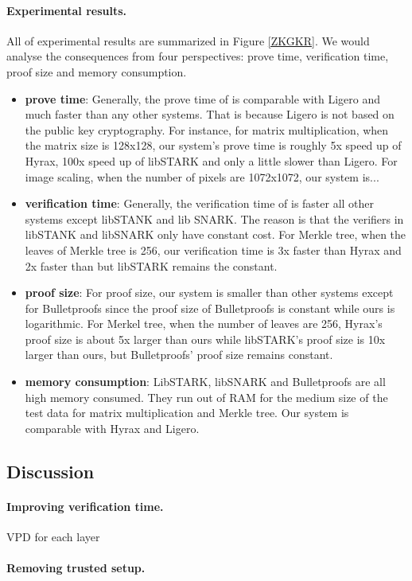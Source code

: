\paragraph{Experimental results.} All of experimental results are summarized in Figure \ref{ZKGKR}. We would analyse the consequences from four perspectives: prove time, verification time, proof size and memory consumption.
\begin{itemize}
	\item \textbf{prove time}: Generally, the prove time of \name{} is comparable with Ligero and much faster than any other systems. That is because Ligero is not based on the public key cryptography. For instance, for matrix multiplication, when the matrix size is 128x128, our system's prove time is roughly 5x speed up of Hyrax, 100x speed up of libSTARK and only a little slower than Ligero. For image scaling, when the number of pixels are 1072x1072, our system is...
	\item \textbf{verification time}: Generally, the verification time of \name{} is faster all other systems except libSTANK and lib SNARK. The reason is that the verifiers in libSTANK and libSNARK only have constant cost. For Merkle tree, when the leaves of Merkle tree is 256, our verification time is 3x faster than Hyrax and 2x faster than but libSTARK remains the constant. 
	\item \textbf{proof size}: For proof size, our system is smaller than other systems except for Bulletproofs since the proof size of Bulletproofs is constant while ours is logarithmic. For Merkel tree, when the number of leaves are 256, Hyrax's proof size is about 5x larger than ours while libSTARK's proof size is 10x larger than ours, but Bulletproofs' proof size remains constant.  
	\item \textbf{memory consumption}: LibSTARK, libSNARK and Bulletproofs are all high memory consumed. They run out of RAM for the medium size of the test data for matrix multiplication and Merkle tree. Our system is comparable with Hyrax and Ligero.
\end{itemize}

\subsection{Discussion}

\paragraph{Improving verification time.}

VPD for each layer

\paragraph{Removing trusted setup.}